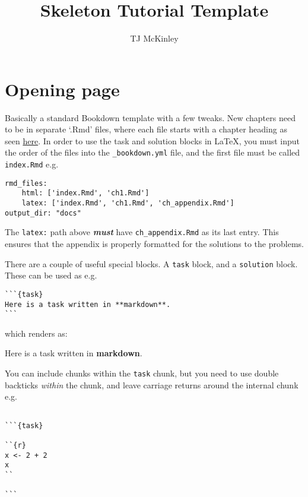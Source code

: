 \documentclass[]{book}
\title{Skeleton Tutorial Template}
\author{TJ McKinley}
\date{}
\newcommand{\bblockT}[2][Task]{\begin{tcolorbox}[title = #1 #2, parbox = false]}
\newcommand{\eblockT}{\end{tcolorbox}}
\begin{document}
\maketitle

{
\hypersetup{linkcolor=black}
\setcounter{tocdepth}{1}
\tableofcontents
}
\hypertarget{opening-page}{%
\chapter{Opening page}\label{opening-page}}

Basically a standard Bookdown template with a few tweaks. New chapters need to be in separate `.Rmd' files, where each file starts with a chapter heading as seen \href{https://bookdown.org/yihui/bookdown/usage.html}{here}. In order to use the task and solution blocks in \LaTeX, you must input the order of the files into the \texttt{\_bookdown.yml} file, and the first file must be called \texttt{index.Rmd} e.g.

\begin{verbatim}
rmd_files:
    html: ['index.Rmd', 'ch1.Rmd']
    latex: ['index.Rmd', 'ch1.Rmd', 'ch_appendix.Rmd']
output_dir: "docs"
\end{verbatim}

The \texttt{latex:} path above \textbf{\emph{must}} have \texttt{\textquotesingle{}ch\_appendix.Rmd\textquotesingle{}} as its last entry. This ensures that the appendix is properly formatted for the solutions to the problems.

There are a couple of useful special blocks. A \texttt{task} block, and a \texttt{solution} block. These can be used as e.g.

\begin{verbatim}
```{task}
Here is a task written in **markdown**.
```
\end{verbatim}

which renders as:

\hypertarget{tsk1}{}\bblockT[Task]{\phantomsection\label{sol1}1}

Here is a task written in \textbf{markdown}.
\eblockT

You can include chunks within the \texttt{task} chunk, but you need to use double backticks \emph{within} the chunk, and leave carriage returns around the internal chunk e.g.

\begin{verbatim}

```{task}

``{r}
x <- 2 + 2
x
``

```
\end{verbatim}
\end{document}
